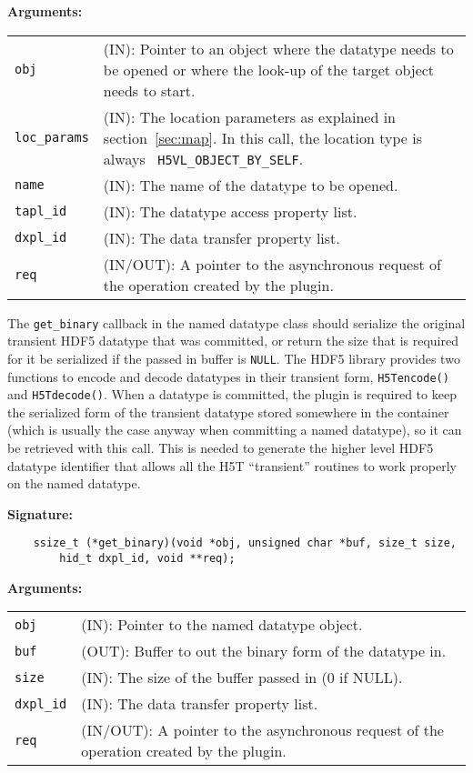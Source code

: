 \textbf{Arguments:}\\
\begin{tabular}{l p{10cm}}
  {\tt obj} & (IN): Pointer to an object where the datatype needs
  to be opened or where the look-up of the target object needs to
  start.\\
  {\tt loc\_params} & (IN): The location parameters as explained in
  section~\ref{sec:map}. In this call, the location type is always {\tt
    H5VL\_OBJECT\_BY\_SELF}. \\
  {\tt name} & (IN): The name of the datatype to be opened.\\
  {\tt tapl\_id} & (IN): The datatype access property list.\\
  {\tt dxpl\_id} & (IN): The data transfer property list.\\
  {\tt req} & (IN/OUT): A pointer to the asynchronous request of the
  operation created by the plugin.\\
\end{tabular}

The {\tt get\_binary} callback in the named datatype class should
serialize the original transient HDF5 datatype that was committed, or
return the size that is required for it be serialized if the passed in
buffer is {\tt NULL}. The HDF5 library provides two functions to
encode and decode datatypes in their transient form, {\tt H5Tencode()}
and {\tt H5Tdecode()}. When a datatype is committed, the plugin is
required to keep the serialized form of the transient datatype stored
somewhere in the container (which is usually the case anyway when
committing a named datatype), so it can be retrieved with this
call. This is needed to generate the higher level HDF5 datatype
identifier that allows all the H5T ``transient'' routines to work
properly on the named datatype.

\textbf{Signature:}
\begin{lstlisting}
    ssize_t (*get_binary)(void *obj, unsigned char *buf, size_t size, 
        hid_t dxpl_id, void **req);
\end{lstlisting}

\textbf{Arguments:}\\
\begin{tabular}{l p{10cm}}
  {\tt obj} & (IN): Pointer to the named datatype object.\\
  {\tt buf} & (OUT): Buffer to out the binary form of the datatype in.\\
  {\tt size} & (IN): The size of the buffer passed in (0 if NULL).\\
  {\tt dxpl\_id} & (IN): The data transfer property list.\\
  {\tt req} & (IN/OUT): A pointer to the asynchronous request of the
  operation created by the plugin.\\
\end{tabular}

